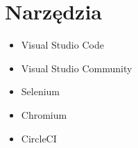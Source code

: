 \documentclass[12pt]{report}
\begin{document}
		\section{Narzędzia}
		\begin{itemize}
			\item Visual Studio Code
			\item Visual Studio Community
			\item Selenium
			\item Chromium
			\item CircleCI
		\end{itemize}
	
\end{document}
